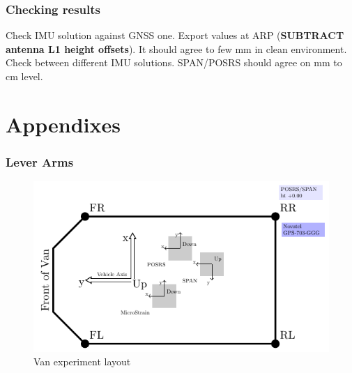 \documentclass[11pt,fleqn]{book} %
\begin{document}
\section{Checking results}
Check IMU solution against GNSS one. Export values at ARP (\textbf{SUBTRACT antenna L1 height offsets}). It should agree to few mm in clean environment.  Check between different IMU solutions. SPAN/POSRS should agree on mm to cm level.


\renewcommand\thesection{\Alph{section}}
\renewcommand{\thepart}{\Alph{part}}
\setcounter{part}{0}
\setcounter{chapter}{1}
\setcounter{section}{0}
\part{Appendixes}



\section{Lever Arms}

\begin{figure}[!htb]
\centering\includegraphics[clip,width=16cm]{pic/VanLayout}%
\caption{Van experiment layout\label{fig:Van-experiment-layout}}
\end{figure}
\end{document}
